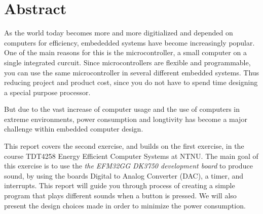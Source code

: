 	\section*{Abstract}

As the world today becomes more and more digitialized and depended on computers for efficiency,
embededded systems have become  increasingly popular. One of the main reasons for this is the
microcontroller, a small computer on a single integrated curcuit. Since microcontrollers are flexible 
and programmable, you can use the same microcontroller in several different embedded systems. Thus reducing
project and product cost, since you do not have to spend time designing a special purpose processor. 

But due to the vast increase of computer usage and the use of computers in extreme environments, power consumption 
and longtivity has become a major challenge within embedded computer design. 


This report covers the second exercise, and builds on the first exercise, in the course TDT4258 Energy Efficient Computer Systems at NTNU. The main goal of this exercise is to use the \textit{the EFM32GG DK3750 development board} to produce sound, by using the boards Digital to Analog Converter (DAC), a timer, and interrupts. This report will guide you through process of creating a simple program that plays different sounds when a button is pressed. We will also present the design choices made in order to minimize the power consumption. 

